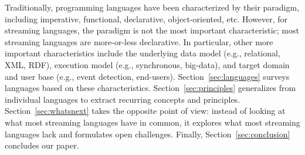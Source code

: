 Traditionally, programming languages have been characterized by their
paradigm, including imperative, functional, declarative,
object-oriented, etc. However, for streaming languages, the paradigm
is not the most important characteristic; most streaming languages are
more-or-less declarative. In particular, other more important characteristics include the underlying
data model (e.g., relational, XML, RDF), execution model (e.g.,
synchronous, big-data), and target domain and user base (e.g., event
detection, end-users).  Section~\ref{sec:languages} surveys languages
based on these characteristics. Section~\ref{sec:principles} generalizes from individual languages to
extract recurring concepts and principles. Section~\ref{sec:whatsnext}
takes the opposite point of view: instead of looking at what most
streaming languages have in common, it explores what most streaming
languages lack and formulates open challenges. Finally,
Section~\ref{sec:conclusion} concludes our paper.
